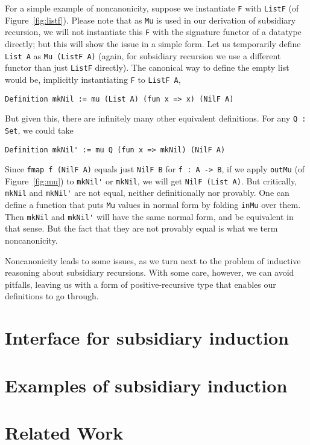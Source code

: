 \documentclass[a4paper,USenglish]{lipics-v2021}
\begin{document}
For a simple example of noncanonicity, suppose we instantiate \verb|F|
with \verb|ListF| (of Figure~\ref{fig:listf}).  Please note that as
\verb|Mu| is used in our derivation of subsidiary recursion, we will
not instantiate this \verb|F| with the signature functor of a datatype
directly; but this will show the issue in a simple form.  Let us
temporarily define \verb|List A| as \verb|Mu (ListF A)| (again, for
subsidiary recursion we use a different functor than just \verb|ListF|
directly).  The canonical way to define the empty list would be, 
implicitly instantiating \verb|F| to \verb|ListF A|,
\begin{verbatim}
Definition mkNil := mu (List A) (fun x => x) (NilF A)
\end{verbatim}
\noindent But given this, there are infinitely many other equivalent
definitions.  For any \verb|Q : Set|, we could take
\begin{verbatim}
Definition mkNil' := mu Q (fun x => mkNil) (NilF A)
\end{verbatim}
\noindent Since \verb|fmap f (NilF A)| equals just \verb|NilF B| for
\verb|f : A -> B|, if we apply \verb|outMu| (of Figure~\ref{fig:mu})
to \verb|mkNil'| or \verb|mkNil|, we will get \verb|NilF (List A)|.
But critically, \verb|mkNil| and \verb|mkNil'| are not equal, neither
definitionally nor provably.  One can define a function that puts
\verb|Mu| values in normal form by folding \verb|inMu| over them.
Then \verb|mkNil| and \verb|mkNil'| will have the same normal form,
and be equivalent in that sense.  But the fact that they are not
provably equal is what we term noncanonicity.

Noncanonicity leads to some issues, as we turn next to the problem of
inductive reasoning about subsidiary recursions.  With some care,
however, we can avoid pitfalls, leaving us with a form of
positive-recursive type that enables our definitions to go through.

\section{Interface for subsidiary induction}
\label{sec:interfacei}

\section{Examples of subsidiary induction}
\label{sec:examplesi}

\section{Related Work}
\label{sec:related}
\end{document}
